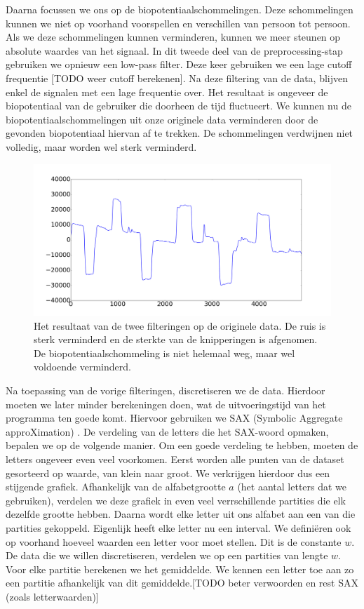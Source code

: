 \documentclass{article}
\begin{document}
Daarna focussen we ons op de biopotentiaalschommelingen. Deze schommelingen kunnen we niet op voorhand voorspellen en verschillen van persoon tot persoon. Als we deze schommelingen kunnen verminderen, kunnen we meer steunen op absolute waardes van het signaal. In dit tweede deel van de preprocessing-stap gebruiken we opnieuw een low-pass filter. Deze keer gebruiken we een lage cutoff frequentie [TODO weer cutoff berekenen]. Na deze filtering van de data, blijven enkel de signalen met een lage frequentie over. Het resultaat is ongeveer de biopotentiaal van de gebruiker die doorheen de tijd fluctueert. We kunnen nu de biopotentiaalschommelingen uit onze originele data verminderen door de gevonden biopotentiaal hiervan af te trekken. De schommelingen verdwijnen niet volledig, maar worden wel sterk verminderd.

\begin{figure}[h]
\centering
\includegraphics[width=\linewidth]{images/filtered_data}
\caption{Het resultaat van de twee filteringen op de originele data. De ruis is sterk verminderd en de sterkte van de knipperingen is afgenomen. De biopotentiaalschommeling is niet helemaal weg, maar wel voldoende verminderd.}
\end{figure}

Na toepassing van de vorige filteringen, discretiseren we de data. Hierdoor moeten we later minder berekeningen doen, wat de uitvoeringstijd van het programma ten goede komt. Hiervoor gebruiken we SAX (Symbolic Aggregate approXimation) \cite{sax}. De verdeling van de letters die het SAX-woord opmaken, bepalen we op de volgende manier. Om een goede verdeling te hebben, moeten de letters ongeveer even veel voorkomen. Eerst worden alle punten van de dataset gesorteerd op waarde, van klein naar groot. We verkrijgen hierdoor dus een stijgende grafiek. Afhankelijk van de alfabetgrootte $a$ (het aantal letters dat we gebruiken), verdelen we deze grafiek in even veel verrschillende partities die elk dezelfde grootte hebben. Daarna wordt elke letter uit ons alfabet aan een van die partities gekoppeld. Eigenlijk heeft elke letter nu een interval. We definiëren ook op voorhand hoeveel waarden een letter voor moet stellen. Dit is de constante $w$. De data die we willen discretiseren, verdelen we op een partities van lengte $w$. Voor elke partitie berekenen we het gemiddelde. We kennen een letter toe aan zo een partitie afhankelijk van dit gemiddelde.[TODO beter verwoorden en rest SAX (zoals letterwaarden)]
\end{document}
